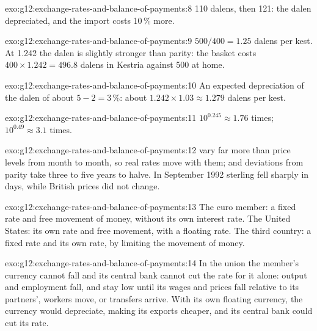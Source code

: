 \begin{solution}{exo:g12:exchange-rates-and-balance-of-payments:8}
110 dalens, then 121: the dalen depreciated, and the import costs 10\,\% more.
\end{solution}

\begin{solution}{exo:g12:exchange-rates-and-balance-of-payments:9}
$500/400 = 1.25$ dalens per kest. At 1.242 the dalen is slightly stronger than parity: the basket costs $400 \times 1.242 = 496.8$ dalens in Kestria against 500 at home.
\end{solution}

\begin{solution}{exo:g12:exchange-rates-and-balance-of-payments:10}
An expected depreciation of the dalen of about $5 - 2 = 3\,\%$: about $1.242 \times 1.03 \approx 1.279$ dalens per kest.
\end{solution}

\begin{solution}{exo:g12:exchange-rates-and-balance-of-payments:11}
$10^{0.245} \approx 1.76$ times; $10^{0.49} \approx 3.1$ times.
\end{solution}

\begin{solution}{exo:g12:exchange-rates-and-balance-of-payments:12}
 vary far more than price levels from month to month, so real rates move with them; and deviations from parity take three to five years to halve. In
September 1992 sterling fell sharply in days, while British prices did not change.
\end{solution}

\begin{solution}{exo:g12:exchange-rates-and-balance-of-payments:13}
The euro member: a fixed rate and free movement of money, without its own interest rate. The United States: its own rate and free movement, with a floating rate. The third
country: a fixed rate and its own rate, by limiting the movement of money.
\end{solution}

\begin{solution}{exo:g12:exchange-rates-and-balance-of-payments:14}
In the union the member's currency cannot fall and its central bank cannot cut the rate for it alone: output and employment fall, and stay low until its wages and prices fall
relative to its partners', workers move, or transfers arrive. With its own floating currency, the currency would depreciate, making its exports cheaper, and its central bank
could cut its rate.
\end{solution}

